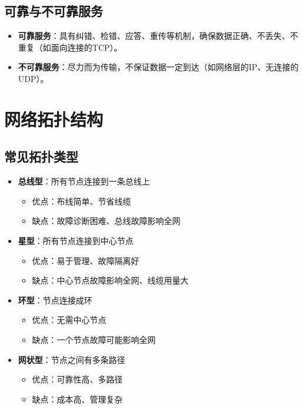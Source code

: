 \subsection{可靠与不可靠服务}
\begin{itemize}[leftmargin=2em,itemsep=0pt]
    \item \textbf{可靠服务}：具有纠错、检错、应答、重传等机制，确保数据正确、不丢失、不重复（如面向连接的TCP）。
    \item \textbf{不可靠服务}：尽力而为传输，不保证数据一定到达（如网络层的IP、无连接的UDP）。
\end{itemize}

\section{网络拓扑结构}
\subsection{常见拓扑类型}
\begin{itemize}[leftmargin=2em,itemsep=0pt]
    \item \textbf{总线型}：所有节点连接到一条总线上
    \begin{itemize}[itemsep=0pt]
        \item 优点：布线简单、节省线缆
        \item 缺点：故障诊断困难、总线故障影响全网
    \end{itemize}
    \item \textbf{星型}：所有节点连接到中心节点
    \begin{itemize}[itemsep=0pt]
        \item 优点：易于管理、故障隔离好
        \item 缺点：中心节点故障影响全网、线缆用量大
    \end{itemize}
    \item \textbf{环型}：节点连接成环
    \begin{itemize}[itemsep=0pt]
        \item 优点：无需中心节点
        \item 缺点：一个节点故障可能影响全网
    \end{itemize}
    \item \textbf{网状型}：节点之间有多条路径
    \begin{itemize}[itemsep=0pt]
        \item 优点：可靠性高、多路径
        \item 缺点：成本高、管理复杂
    \end{itemize}
\end{itemize}

